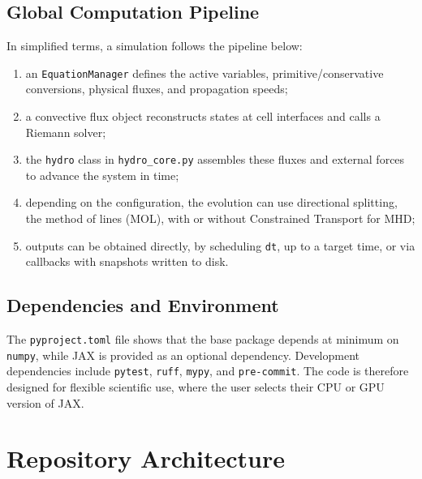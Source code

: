 \documentclass[a4paper, 11pt]{article}
\begin{document}
\subsection{Global Computation Pipeline}
In simplified terms, a simulation follows the pipeline below:
\begin{enumerate}
    \item an \texttt{EquationManager} defines the active variables, primitive/conservative conversions, physical fluxes, and propagation speeds;
    \item a convective flux object reconstructs states at cell interfaces and calls a Riemann solver;
    \item the \texttt{hydro} class in \texttt{hydro\_core.py} assembles these fluxes and external forces to advance the system in time;
    \item depending on the configuration, the evolution can use directional splitting, the method of lines (MOL), with or without Constrained Transport for MHD;
    \item outputs can be obtained directly, by scheduling \texttt{dt}, up to a target time, or via callbacks with snapshots written to disk.
\end{enumerate}

\subsection{Dependencies and Environment}
The \texttt{pyproject.toml} file shows that the base package depends at minimum on \texttt{numpy}, while JAX is provided as an optional dependency. Development dependencies include \texttt{pytest}, \texttt{ruff}, \texttt{mypy}, and \texttt{pre-commit}. The code is therefore designed for flexible scientific use, where the user selects their CPU or GPU version of JAX.

\section{Repository Architecture}
\end{document}
